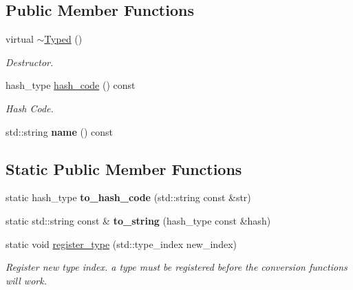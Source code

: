 \subsection*{\-Public \-Member \-Functions}
\begin{DoxyCompactItemize}
\item 
\hypertarget{classNeb_1_1Util_1_1Typed_a26985d3d681e88f022673506bc45b651}{virtual \hyperlink{classNeb_1_1Util_1_1Typed_a26985d3d681e88f022673506bc45b651}{$\sim$\-Typed} ()}\label{classNeb_1_1Util_1_1Typed_a26985d3d681e88f022673506bc45b651}

\begin{DoxyCompactList}\small\item\em \-Destructor. \end{DoxyCompactList}\item 
\hypertarget{classNeb_1_1Util_1_1Typed_aad8d05f1c6a16e5ef11803d77613dd3f}{hash\-\_\-type \hyperlink{classNeb_1_1Util_1_1Typed_aad8d05f1c6a16e5ef11803d77613dd3f}{hash\-\_\-code} () const }\label{classNeb_1_1Util_1_1Typed_aad8d05f1c6a16e5ef11803d77613dd3f}

\begin{DoxyCompactList}\small\item\em \-Hash \-Code. \end{DoxyCompactList}\item 
\hypertarget{classNeb_1_1Util_1_1Typed_abf7ccf80a9f588ebd81118916643a9eb}{std\-::string {\bfseries name} () const }\label{classNeb_1_1Util_1_1Typed_abf7ccf80a9f588ebd81118916643a9eb}

\end{DoxyCompactItemize}
\subsection*{\-Static \-Public \-Member \-Functions}
\begin{DoxyCompactItemize}
\item 
\hypertarget{classNeb_1_1Util_1_1Typed_a85634784ab460586fe76972f57b3c59d}{static hash\-\_\-type {\bfseries to\-\_\-hash\-\_\-code} (std\-::string const \&str)}\label{classNeb_1_1Util_1_1Typed_a85634784ab460586fe76972f57b3c59d}

\item 
\hypertarget{classNeb_1_1Util_1_1Typed_a1f51abe63e6f90bc940eb3af50844b50}{static std\-::string const \& {\bfseries to\-\_\-string} (hash\-\_\-type const \&hash)}\label{classNeb_1_1Util_1_1Typed_a1f51abe63e6f90bc940eb3af50844b50}

\item 
\hypertarget{classNeb_1_1Util_1_1Typed_a7dde8c08a7b5333f77b4c37fec991047}{static void \hyperlink{classNeb_1_1Util_1_1Typed_a7dde8c08a7b5333f77b4c37fec991047}{register\-\_\-type} (std\-::type\-\_\-index new\-\_\-index)}\label{classNeb_1_1Util_1_1Typed_a7dde8c08a7b5333f77b4c37fec991047}

\begin{DoxyCompactList}\small\item\em \-Register new type index. a type must be registered before the conversion functions will work. \end{DoxyCompactList}\end{DoxyCompactItemize}
